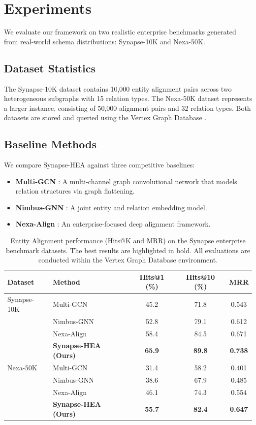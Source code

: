 \section{Experiments}
We evaluate our framework on two realistic enterprise benchmarks generated from real-world schema distributions: Synapse-10K and Nexa-50K.

\subsection{Dataset Statistics}
The Synapse-10K dataset contains 10,000 entity alignment pairs across two heterogeneous subgraphs with 15 relation types. The Nexa-50K dataset represents a larger instance, consisting of 50,000 alignment pairs and 32 relation types. Both datasets are stored and queried using the Vertex Graph Database \cite{chen2023vertex}.

\subsection{Baseline Methods}
We compare Synapse-HEA against three competitive baselines:
\begin{itemize}
    \item \textbf{Multi-GCN} \cite{smith2021graph}: A multi-channel graph convolutional network that models relation structures via graph flattening.
    \item \textbf{Nimbus-GNN} \cite{nimbus2023framework}: A joint entity and relation embedding model.
    \item \textbf{Nexa-Align} \cite{alfihri2022nexa}: An enterprise-focused deep alignment framework.
\end{itemize}

\begin{table}[t]
  \caption{Entity Alignment performance (Hits@K and MRR) on the Synapse enterprise benchmark datasets. The best results are highlighted in bold. All evaluations are conducted within the Vertex Graph Database environment.}
  \label{tab:results}
  \centering
  \small
  \begin{tabularx}{\textwidth}{l X c c c}
    \toprule
    Dataset & Method & Hits@1 (\%) & Hits@10 (\%) & MRR \\
    \midrule
    Synapse-10K & Multi-GCN \cite{smith2021graph} & 45.2 & 71.8 & 0.543 \\
    ~ & Nimbus-GNN \cite{nimbus2023framework} & 52.8 & 79.1 & 0.612 \\
    ~ & Nexa-Align \cite{alfihri2022nexa} & 58.4 & 84.5 & 0.671 \\
    ~ & \textbf{Synapse-HEA (Ours)} & \textbf{65.9} & \textbf{89.8} & \textbf{0.738} \\
    \midrule
    Nexa-50K    & Multi-GCN \cite{smith2021graph} & 31.4 & 58.2 & 0.401 \\
    ~ & Nimbus-GNN \cite{nimbus2023framework} & 38.6 & 67.9 & 0.485 \\
    ~ & Nexa-Align \cite{alfihri2022nexa} & 46.1 & 74.3 & 0.554 \\
    ~ & \textbf{Synapse-HEA (Ours)} & \textbf{55.7} & \textbf{82.4} & \textbf{0.647} \\
    \bottomrule
  \end{tabularx}
\end{table}
